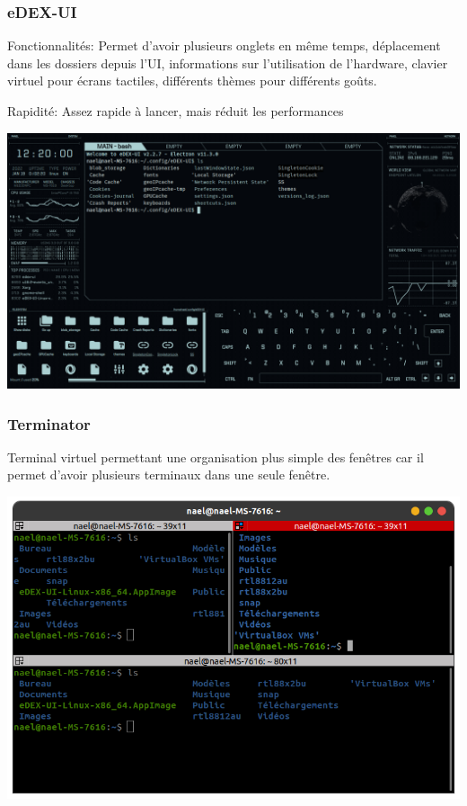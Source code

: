 \documentclass{article}
\begin{document}
\subsubsection{ eDEX-UI}
\noindent Fonctionnalités: Permet d'avoir plusieurs onglets en même temps, déplacement dans les dossiers depuis l'UI, informations sur l'utilisation de l'hardware, clavier virtuel pour écrans tactiles, différents thèmes pour différents goûts.

\noindent Rapidité: Assez rapide à lancer, mais réduit les performances

\begin{center}
\includegraphics[scale=0.2]{image/edexUI.png}
\end{center}

\subsubsection{ Terminator}
\noindent Terminal virtuel permettant une organisation plus simple des fenêtres car il permet d'avoir plusieurs terminaux dans une seule fenêtre.


\begin{center}
\includegraphics[scale=0.3]{image/terminator.png}
\end{center}
\end{document}
